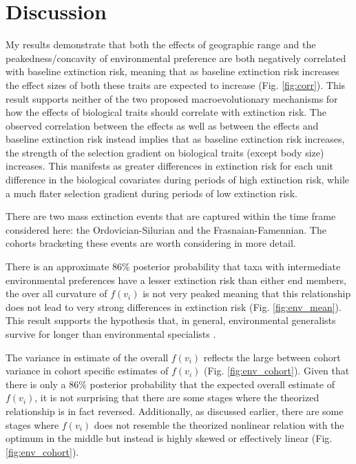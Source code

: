 \documentclass[12pt,letterpaper]{article}
\begin{document}
\section{Discussion}

My results demonstrate that both the effects of geographic range and the peakedness/concavity of environmental preference are both negatively correlated with baseline extinction risk, meaning that as baseline extinction risk increases the effect sizes of both these traits are expected to increase (Fig. \ref{fig:corr}). This result supports neither of the two proposed macroevolutionary mechanisms for how the effects of biological traits should correlate with extinction risk. The observed correlation between the effects as well as between the effects and baseline extinction risk instead implies that as baseline extinction risk increases, the strength of the selection gradient on biological traits (except body size) increases. This manifests as greater differences in extinction risk for each unit difference in the biological covariates during periods of high extinction risk, while a much flater selection gradient during periods of low extinction risk.

There are two mass extinction events that are captured within the time frame considered here: the Ordovician-Silurian and the Frasnaian-Famennian. The cohorts bracketing these events are worth considering in more detail.


There is an approximate 86\% posterior probability that taxa with intermediate environmental preferences have a lesser extinction risk than either end members, the over all curvature of \(f(v_{i})\) is not very peaked meaning that this relationship does not lead to very strong differences in extinction risk (Fig. \ref{fig:env_mean}). This result supports the hypothesis that, in general, environmental generalists survive for longer than environmental specialists \citep{Simpson1944,Liow2004a,Liow2007b,Nurnberg2013a,Nurnberg2015}.

The variance in estimate of the overall \(f(v_{i})\) reflects the large between cohort variance in cohort specific estimates of \(f(v_{i})\) (Fig. \ref{fig:env_cohort}). Given that there is only a 86\% posterior probability that the expected overall estimate of \(f(v_{i})\), it is not surprising that there are some stages where the theorized relationship is in fact reversed. Additionally, as discussed earlier, there are some stages where \(f(v_{i})\) does not resemble the theorized nonlinear relation with the optimum in the middle but instead is highly skewed or effectively linear (Fig. \ref{fig:env_cohort}). 
\end{document}
